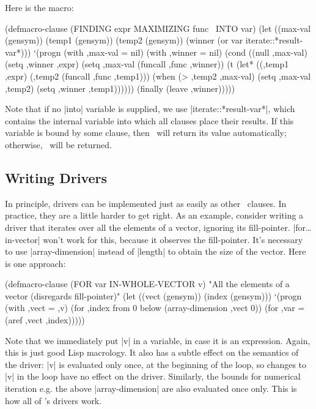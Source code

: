 Here is the macro:
\begin{program}
(defmacro-clause (FINDING expr MAXIMIZING func \opt\ INTO var)
  (let ((max-val (gensym))
        (temp1 (gensym))
        (temp2 (gensym))
        (winner (or var iterate::*result-var*)))
    `(progn
       (with ,max-val = nil)
       (with ,winner = nil)
       (cond
        ((null ,max-val)
         (setq ,winner ,expr)
         (setq ,max-val (funcall ,func ,winner))
        (t
         (let* ((,temp1 ,expr)
                (,temp2 (funcall ,func ,temp1)))
           (when (> ,temp2 ,max-val)
             (setq ,max-val ,temp2)
             (setq ,winner ,temp1))))))
       (finally (leave ,winner)))))
\end{program}
Note that if no |into| variable is supplied, we use
|iterate::*result-var*|, which contains the internal variable into
which all clauses place their results.  If this variable is bound by
some clause, then \iter\ will return its value automatically;
otherwise, \nil\ will be returned.

\subsection{Writing Drivers}

In principle, drivers can be implemented just as easily as other
\iter\ clauses.  In practice, they are a little harder to get right.
As an example, consider writing a driver that
iterates over all the
elements of a vector, ignoring its fill-pointer.  |for\dots in-vector|
won't work for this, because it observes the fill-pointer.  It's necessary to
use |array-dimension| instead of |length| to obtain the size of the
vector.  Here is one approach:

\begin{program}
(defmacro-clause (FOR var IN-WHOLE-VECTOR v)
  "All the elements of a vector (disregards fill-pointer)"
  (let ((vect (gensym))
        (index (gensym)))
    `(progn
       (with ,vect = ,v)
       (for ,index from 0 below (array-dimension ,vect 0))
       (for ,var = (aref ,vect ,index)))))
\end{program}
Note that we immediately put |v| in a variable, in case it is an
expression.  Again, this is just good Lisp macrology.  It also has a
subtle effect on the semantics of the driver: |v| is evaluated only
once, at the beginning of the loop, so changes to |v| in the loop have
no effect on the driver.  Similarly, the bounds for numerical iteration
e.g. the above |array-dimension| are also evaluated once only.  This is how
all of \iter's drivers work.


